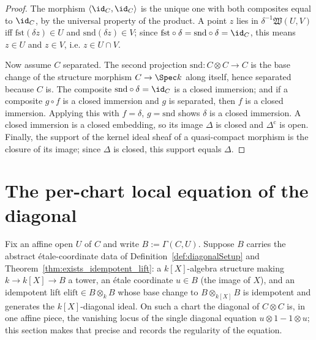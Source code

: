 \begin{proof}
  \leanok
  The morphism \(\langle \id_C, \id_C\rangle\) is the unique one with both composites equal to
  \(\id_C\), by the universal property of the product. A point \(z\) lies in
  \(\delta^{-1}\mathfrak W(U,V)\) iff \(\mathrm{fst}(\delta z) \in U\) and
  \(\mathrm{snd}(\delta z) \in V\); since \(\mathrm{fst} \circ \delta = \mathrm{snd} \circ \delta = \id_C\),
  this means \(z \in U\) and \(z \in V\), i.e. \(z \in U \cap V\).

  Now assume \(C\) separated. The second projection \(\mathrm{snd} \colon C \otimes C \to C\) is
  the base change of the structure morphism \(C \to \Spec k\) along itself, hence separated
  because \(C\) is. The composite \(\mathrm{snd} \circ \delta = \id_C\) is a closed immersion; and
  if a composite \(g \circ f\) is a closed immersion and \(g\) is separated, then \(f\) is a
  closed immersion. Applying this with \(f = \delta\), \(g = \mathrm{snd}\) shows \(\delta\) is a
  closed immersion. A closed immersion is a closed embedding, so its image \(\Delta\) is closed
  and \(\Delta^{\mathrm{c}}\) is open. Finally, the support of the kernel ideal sheaf of a
  quasi-compact morphism is the closure of its image; since \(\Delta\) is closed, this support
  equals \(\Delta\).
\end{proof}

\section{The per-chart local equation of the diagonal}

Fix an affine open \(U\) of \(C\) and write \(B := \Gamma(C, U)\). Suppose \(B\) carries the
abstract \'etale-coordinate data of Definition~\ref{def:diagonalSetup} and
Theorem~\ref{thm:exists_idempotent_lift}: a \(k[X]\)-algebra structure making \(k \to k[X] \to B\)
a tower, an \'etale coordinate \(u \in B\) (the image of \(X\)), and an idempotent lift
\(\mathrm{elift} \in B \otimes_k B\) whose base change to \(B \otimes_{k[X]} B\) is idempotent and
generates the \(k[X]\)-diagonal ideal. On such a chart the diagonal of \(C \otimes C\) is, in one
affine piece, the vanishing locus of the single diagonal equation \(u \otimes 1 - 1 \otimes u\);
this section makes that precise and records the regularity of the equation.

